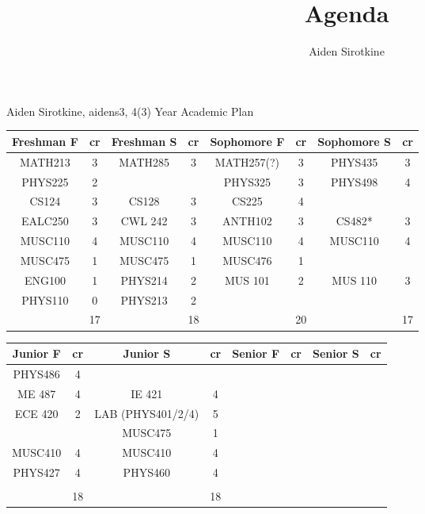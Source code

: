 \documentclass{article}
\date{}
\title{Agenda}
\author{Aiden Sirotkine}
\newcommand{\comment}[1]{}
\begin{document}
Aiden Sirotkine, aidens3, 4(3) Year Academic Plan
\begin{center}
\begin{tabular}{| c | c | c | c | c | c | c | c |}
Freshman F& cr & Freshman S & cr & Sophomore F & cr & Sophomore S & cr  \\ \hline
MATH213 & 3 & MATH285 & 3 & MATH257(?) & 3 & PHYS435& 3\\ \hline
PHYS225 & 2 & & & PHYS325 & 3 & PHYS498 & 4\\ \hline
CS124 & 3 & CS128 & 3 & CS225 & 4 &  & \\ \hline
EALC250 & 3 & CWL 242 & 3 & ANTH102 & 3 & CS482* & 3 \\ \hline
MUSC110 & 4 & MUSC110 & 4 & MUSC110 & 4 & MUSC110 & 4\\ \hline
MUSC475 & 1 & MUSC475 & 1 & MUSC476 & 1 & & \\ \hline
ENG100 & 1 & PHYS214 & 2 & MUS 101 & 2 & MUS 110 & 3 \\ \hline
PHYS110 & 0 & PHYS213 & 2\\ \hline
 & 17 & & 18 & & 20 & & 17 \\ \hline


\end{tabular}
\end{center}

\begin{center}
\begin{tabular}{| c | c | c | c | c | c | c | c |}
Junior F& cr & Junior S & cr & Senior F & cr & Senior S & cr  \\ \hline
PHYS486 & 4 & \comment{PHYS487 (O)} & \comment{4}\\ \hline
ME 487 & 4 & IE 421 & 4 \\  \hline
ECE 420 & 2 & LAB (PHYS401/2/4) & 5 	\\ \hline
 &  & MUSC475 & 1 \\ \hline
MUSC410 & 4 & MUSC410 & 4 \\ \hline
PHYS427 & 4 & PHYS460 & 4 \\ \hline
 & & & \\ \hline
& 18 & & 18 \\ \hline


\end{tabular}
\end{center}


\end{document}
